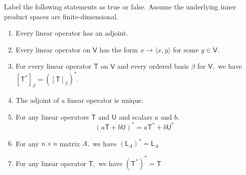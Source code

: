 Label the following statements as true or false. Assume the underlying
inner product spaces are finite-dimensional. 
\begin{enumerate}
\item Every linear operator has an adjoint. 



\item Every linear operator on $\mathsf{V}$ has the form $x \to
  \langle x,y \rangle$ for some $y \in \mathsf{V}.$



\item For every linear operator $\mathsf{T}$ on $\mathsf{V}$ and every
  ordered basis $\beta$ for $\mathsf{V},$ we have
  $[\mathsf{T}^*]_\beta = \left([\mathsf{T}]_\beta\right)^*.$



\item The adjoint of a linear operator is unique.



\item For any linear operators $\mathsf{T}$ and $\mathsf{U}$ and
  scalars $a$ and $b,$
\[
(a\mathsf{T}+b\mathsf{U})^* = a\mathsf{T}^* + b\mathsf{U}^*
\]



\item For any $n \times n$ matrix $A,$ we have $(\mathsf{L}_A)^* =
  \mathsf{L}_A$



\item For any linear operator $\mathsf{T},$ we have $(\mathsf{T}^*)^*
  = \mathsf{T}$

\end{enumerate}
